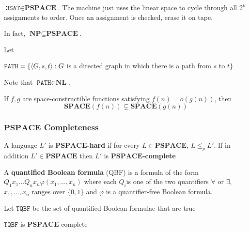 \documentclass[11pt]{article}
\def \SPACE {\textbf{SPACE}}
\def \PSPACE {\textbf{PSPACE}}
\def \NP {\textbf{NP}}
\def \NL {\textbf{NL}}
\def \NP {\textbf{NP}}
\def \TSAT {\texttt{3SAT}}
\def \PATH {\texttt{PATH}}
\def \TQBF {\texttt{TQBF}}
\begin{document}
\begin{examplle}[]
\(\TSAT\in\PSPACE\). The machine just uses the linear space to cycle through all \(2^k\)
assignments to order. Once an assignment is checked, erase it on tape.

In fact, \(\NP\subseteq\PSPACE\).
\end{examplle}

Let
\begin{center}
\(\PATH=\{\la G,s,t\ra:G\) is a directed graph in which there is a path from \(s\) to \(t\}\)
\end{center}
Note that  \(\PATH\in\NL\).

\begin{theorem}
If \(f,g\) are space-constructible functions satisfying \(f(n)=o(g(n))\), then
\begin{equation*}
\SPACE(f(n))\subsetneq\SPACE(g(n))
\end{equation*}
\end{theorem}
\subsubsection{\(\PSPACE\) Completeness}
\label{sec:org057fb51}
\begin{definition}[]
A language \(L'\) is \textbf{\(\PSPACE\)-hard} if for every \(L\in\PSPACE\), \(L\le_p L'\). If in
addition \(L'\in\PSPACE\) then \(L'\) is \textbf{\(\PSPACE\)-complete}
\end{definition}

\begin{definition}
A \textbf{quantified Boolean formula} (QBF) is a formula of the form \(Q_1x_1\dots Q_nx_n\varphi(x_1,\dots,x_n)\) where
each \(Q_i\)is one of the two quantifiers \(\forall\) or \(\exists\), \(x_1,\dots,x_n\) ranges over \(\{0,1\}\) and
\(\varphi\) is a quantifier-free Boolean formula.
\end{definition}

Let \(\TQBF\) be the set of quantified Boolean formulae that are true
\begin{theorem}[]
\label{thm4.13}
\(\TQBF\) is \(\PSPACE\)-complete
\end{theorem}
\end{document}
